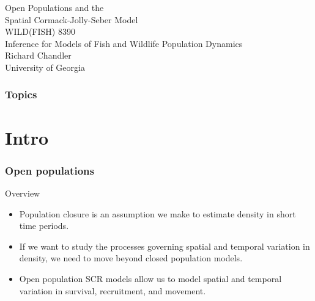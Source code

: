 \documentclass[color=usenames,dvipsnames]{beamer}\usepackage[]{graphicx}\usepackage[]{xcolor}
\begin{document}
\begin{frame}[plain]
  \centering
  \LARGE
  Open Populations and the \\
  Spatial Cormack-Jolly-Seber Model \\
  \vfill
  \large
  WILD(FISH) 8390 \\
  Inference for Models of Fish and Wildlife Population Dynamics \\
  \vfill
  Richard Chandler \\
  University of Georgia \\
\end{frame}







\begin{frame}[plain]
  \frametitle{Topics}
  \Large
\end{frame}




\section{Intro}





\begin{frame}
  \frametitle{Open populations}
  \large
  Overview
  \begin{itemize}[<+->]
    \normalsize
    \item Population closure is an assumption we make to estimate
      density in short time periods.
    \item If we want to study the processes governing spatial
      {and temporal} variation in density, we need to move
      beyond closed population models.
    \item Open population SCR models allow us to model spatial and
      temporal variation in survival, recruitment, and movement.
  \end{itemize}
\end{frame}
\end{document}
